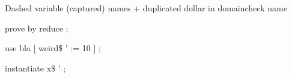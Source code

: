 Dashed variable (captured) names + duplicated dollar in domaincheck name
\begin{zproof}

 prove by reduce ;
 
 use bla [ weird\$ ' := 10 ] ;
 
 instantiate x\$ '  ;
 

\end{zproof}





